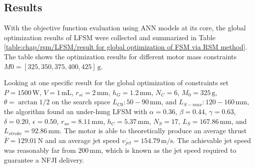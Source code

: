                 
                
                
                    

        \subsection{Results}                   \label{Chapter:RSM/LFSM/Results}        
                
            With the objective function evaluation using \acs{ANN} models at its core, the global optimization results of \acs{LFSM} were collected and summarized in Table\,\ref{table:chap/rsm/LFSM/result for global optimization of FSM via RSM method}. The table shows the optimization results for different motor mass constraints $M0 = [325, 350, 375, 400, 425]\,\mathrm{g}$.
            
            
            Looking at one specific result for the global optimization of constraints set $P=1500\,\mathrm{W}$, $V=1\,\mathrm{mL}$, $r_{si}=2\,\mathrm{mm}$, $h_G=1.2\,\mathrm{mm}$, $N_C=6$, $M_0=325\,\mathrm{g}$, $\theta = \arctan{1/2}$ on the search space $L_{C0}:50-90\,\mathrm{mm}$, and $L_{S-max}:120-160\,\mathrm{mm}$, the algorithm found an under-hung \acs{LFSM} with $\alpha=0.36$, $\beta=0.44$, $\gamma=0.63$, $\delta=0.20$, $\epsilon=0.50$, $r_{so}=8.11\,\mathrm{mm}$, $h_C=5.37\,\mathrm{mm}$, $N_S=17$, $L_S=167.86\,\mathrm{mm}$, and $L_{stroke}=92.86\,\mathrm{mm}$. The motor is able to theoretically produce an average thrust $\overline{F} = 129.01\,\mathrm{N}$ and an average jet speed $\overline{v_{jet}}=154.79\,\mathrm{m/s}$. The achievable jet speed was reasonably far from $200\,\mathrm{mm}$, which is known as the jet speed required to guarantee a \acs{NFJI} delivery. 
            
